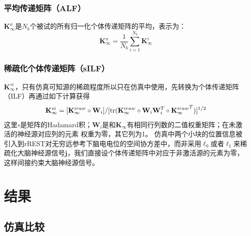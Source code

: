 \subsubsection{平均传递矩阵（ALF）}
$\mathbf{K}_{\infty}^a$是$N_b$个被试的所有归一化个体传递矩阵的平均，表示为：
\begin{equation*}
\mathbf{K}_{\infty}^a=\frac{1}{N_b}\sum_{i=1}^{N_b}\mathbf{K}_{\infty}^i
\end{equation*}

\subsubsection{稀疏化个体传递矩阵（sILF）}
$\mathbf{K}_{\infty}^{si}$，只有仿真可知源的稀疏程度所以只在仿真中使用，先转换为个体传递矩阵（ILF）再通过如下计算获得
\begin{equation*}
\mathbf{K}_{\infty}^{si}=[\mathbf{K}_{\infty}^{iraw}\circ\mathbf{W}_i]/{[\operatorname{tr}(\mathbf{K}_{\infty}^{iraw}\circ\mathbf{W}_i\mathbf{W}_i^T\circ{\mathbf{K}_{\infty}^{iraw}}^T)]^{1/2}}
\end{equation*}
这里$\circ$是矩阵的Hadamard积；$\mathbf{W}_i$是和$\mathbf{K}_{\infty}$有相同行列数的二值权重矩阵；在未激活的神经源对应列的元素
权重为零，其它列为1。 仿真中两个小块的位置信息被引入到rREST对无穷远参考下脑电电位的空间协方差中，而非采用$\ell_0$或者$\ell_1$来稀
疏化大脑神经源信号$\mathbf{j}$，我们直接设个体传递矩阵中对应于非激活源的元素为零，这样间接约束大脑神经源信号。

\section{结果}
\subsection{仿真比较}
